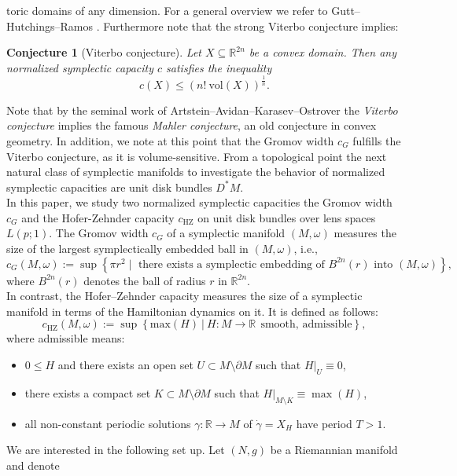 \documentclass[12pt]{article}
\newtheorem{Conjecture}[Definition]{Conjecture}
\newcommand{\R}{\mathbb{R}} %
\newcommand{\hz}{\mathrm{HZ}}
\begin{document}
toric domains of any dimension. For a general overview we refer to Gutt--Hutchings--Ramos \cite{GHR23}.  Furthermore note that the strong Viterbo conjecture implies: 
\begin{Conjecture}[Viterbo conjecture]\label{Viterbo conj}
  Let $X\subseteq \R^{2n}$ be a convex domain. Then any normalized symplectic capacity $c$ satisfies the inequality \[
  c(X)\leq \left(n! \ \mathrm{vol}(X) \right)^{\frac{1}{n}}.
  \]  
\end{Conjecture}
\noindent
Note that by the seminal work of Artstein--Avidan--Karasev--Ostrover \cite{AKO14} the \emph{Viterbo conjecture} implies the famous \emph{Mahler conjecture}, an old conjecture in convex geometry.  In addition, we note at this point that the Gromov width $c_G$ fulfills the Viterbo conjecture, as it is volume-sensitive. From a topological point the next natural class of symplectic manifolds to investigate the behavior of normalized symplectic capacities are unit disk bundles $D^{*}M$. \\
In this paper, we study two normalized symplectic capacities the Gromov width $c_G$ and the Hofer-Zehnder capacity $c_{\hz}$ on unit disk bundles over lens spaces $L(p;1)$. The Gromov width \( c_G \) of a symplectic manifold \( (M,\omega) \) measures the size of the largest symplectically embedded ball in \( (M,\omega) \), i.e.,  
\[
c_G(M,\omega):= \sup \left\{\pi r^2 \mid \text{ there exists a symplectic embedding of } B^{2n}(r) \text{ into } (M,\omega) \right\},
\]
where \( B^{2n}(r) \) denotes the ball of radius \( r \) in $\R^{2n}$. \\
In contrast, the Hofer--Zehnder capacity \cite[Ch.\ 3]{HZ94} measures the size of a symplectic manifold in terms of the Hamiltonian dynamics on it. It is defined as follows:
$$
c_{\hz}(M,\omega):=\sup\left\lbrace \mathrm{max}(H)\ \vert\ H: M\to \R\ \  \text{smooth, admissible}\right\rbrace,
$$
where admissible means:
\begin{itemize}
    \item[(1)] $0\leq H$ and there exists an open set $U\subset M\setminus\partial M$ such that $H\vert_U\equiv 0$,
    \item[(2)] there exists a compact set $K\subset M\setminus\partial M$ such that $H\vert_{M\setminus K}\equiv\max(H)$,
    \item[(3)] all non-constant periodic solutions $\gamma:\R \to M$ of $\dot \gamma=X_H$ have period $T>1$.
\end{itemize}
We are interested in the following set up. Let $(N,g)$ be a Riemannian manifold and denote
\end{document}
